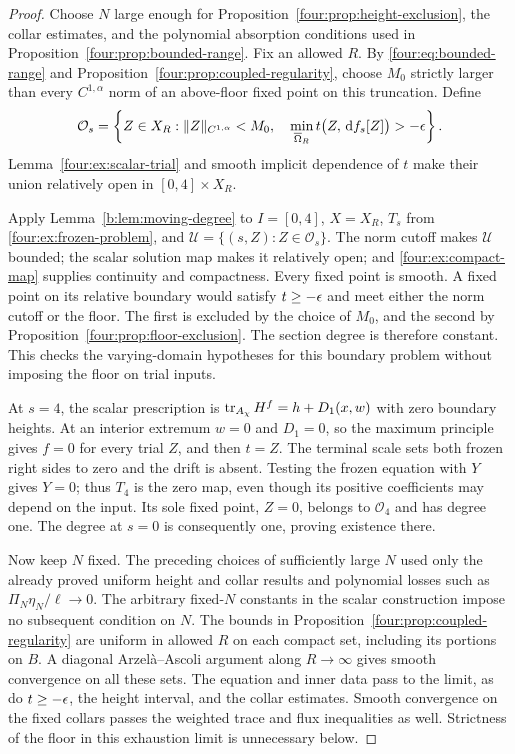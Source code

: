 \begin{proof}
Choose $N$ large enough for Proposition~\ref{four:prop:height-exclusion},
the collar estimates, and the polynomial absorption conditions used
in Proposition~\ref{four:prop:bounded-range}.  Fix an allowed $R$.
By \eqref{four:eq:bounded-range} and
Proposition~\ref{four:prop:coupled-regularity}, choose $M_0$ strictly larger
than every $C^{1,\alpha}$ norm of an above-floor fixed point on this
truncation.  Define
\begin{equation}\label{four:ex:moving-sections}
 \mathcal O_s=\left\{Z\in X_R:
 \|Z\|_{C^{1,\alpha}}<M_0,\quad
 \min_{\overline\Omega_R}t\bigl(Z,\,\mathrm d f_s[Z]\bigr)>-\epsilon\right\}.
\end{equation}
Lemma~\ref{four:ex:scalar-trial} and smooth implicit dependence of $t$ make
their union relatively open in $[0,4]\times X_R$.

Apply Lemma~\ref{b:lem:moving-degree} to $I=[0,4]$, $X=X_R$,
$T_s$ from \eqref{four:ex:frozen-problem}, and
$\mathcal U=\{(s,Z):Z\in\mathcal O_s\}$.
The norm cutoff makes $\mathcal U$ bounded; the scalar solution map
makes it relatively open; and \eqref{four:ex:compact-map} supplies
continuity and compactness. Every fixed point is smooth. A fixed
point on its relative boundary would satisfy $t\ge-\epsilon$ and meet
either the norm cutoff or the floor. The first is excluded by the
choice of $M_0$, and the second by
Proposition~\ref{four:prop:floor-exclusion}. The section degree is
therefore constant. This checks the varying-domain hypotheses for
this boundary problem without imposing the floor on trial inputs.

At $s=4$, the scalar prescription is
$\operatorname{tr}_{A_\chi}H^f=h+D_1(x,w)$ with zero boundary heights.
At an interior extremum $w=0$ and $D_1=0$, so the maximum principle
gives $f=0$ for every trial $Z$, and then $t=Z$.  The terminal scale
sets both frozen right sides to zero and the drift is absent.
Testing the frozen equation with $Y$ gives $Y=0$; thus $T_4$ is the
zero map, even though its positive coefficients may depend on the
input.  Its sole fixed point, $Z=0$, belongs to $\mathcal O_4$ and
has degree one.  The degree at $s=0$ is consequently one, proving
existence there.

Now keep $N$ fixed.  The preceding choices of sufficiently large $N$
used only the already proved uniform height and collar results and
polynomial losses such as $\Pi_N\eta_N/\ell\to0$.  The arbitrary
fixed-$N$ constants in the scalar construction impose no subsequent
condition on $N$.  The bounds in Proposition~\ref{four:prop:coupled-regularity}
are uniform in allowed $R$ on each compact set, including its portions
on $B$.  A diagonal Arzel\`a--Ascoli argument along $R\to\infty$ gives
smooth convergence on all these sets.  The equation and inner data
pass to the limit, as do $t\ge-\epsilon$, the height interval, and the
collar estimates.  Smooth convergence on the fixed collars passes
the weighted trace and flux inequalities as well.  Strictness of the
floor in this exhaustion limit is unnecessary below.
\end{proof}

